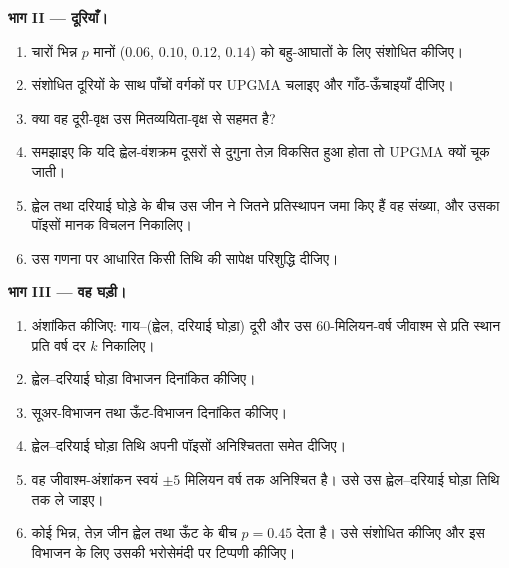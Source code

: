 \begin{problem}
\medskip
\noindent\textbf{भाग II --- दूरियाँ।}
\begin{enumerate}[resume]
  \item चारों भिन्न $p$ मानों ($0.06$, $0.10$, $0.12$,
        $0.14$) को बहु-आघातों के लिए संशोधित कीजिए।
  \item संशोधित दूरियों के साथ पाँचों वर्गकों पर UPGMA चलाइए और
        गाँठ-ऊँचाइयाँ दीजिए।
  \item क्या वह दूरी-वृक्ष उस मितव्ययिता-वृक्ष से सहमत है?
  \item समझाइए कि यदि ह्वेल-वंशक्रम दूसरों से दुगुना तेज़
        विकसित हुआ होता तो UPGMA क्यों चूक जाती।
  \item ह्वेल तथा दरियाई घोड़े के बीच उस जीन ने जितने प्रतिस्थापन
        जमा किए हैं वह संख्या, और उसका पॉइसों
        मानक विचलन निकालिए।
  \item उस गणना पर आधारित किसी तिथि की सापेक्ष परिशुद्धि दीजिए।
\end{enumerate}

\medskip
\noindent\textbf{भाग III --- वह घड़ी।}
\begin{enumerate}[resume]
  \item अंशांकित कीजिए: गाय--(ह्वेल, दरियाई घोड़ा) दूरी और उस
        60-मिलियन-वर्ष जीवाश्म से प्रति स्थान प्रति वर्ष दर $k$ निकालिए।
  \item ह्वेल--दरियाई घोड़ा विभाजन दिनांकित कीजिए।
  \item सूअर-विभाजन तथा ऊँट-विभाजन दिनांकित कीजिए।
  \item ह्वेल--दरियाई घोड़ा तिथि अपनी पॉइसों अनिश्चितता समेत दीजिए।
  \item वह जीवाश्म-अंशांकन स्वयं $\pm 5$ मिलियन वर्ष तक अनिश्चित है।
        उसे उस ह्वेल--दरियाई घोड़ा तिथि तक ले जाइए।
  \item कोई भिन्न, तेज़ जीन ह्वेल तथा ऊँट के बीच $p = 0.45$ देता है।
        उसे संशोधित कीजिए और इस विभाजन के लिए उसकी भरोसेमंदी पर टिप्पणी कीजिए।
\end{enumerate}


\end{problem}

